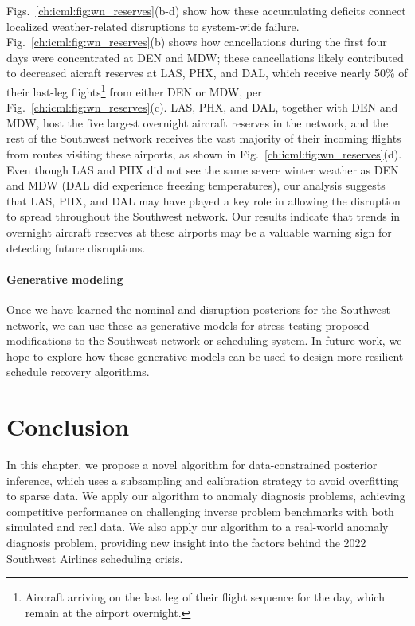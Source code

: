 Figs.~\ref{ch:icml:fig:wn_reserves}(b-d) show how these accumulating deficits connect localized weather-related disruptions to system-wide failure. Fig.~\ref{ch:icml:fig:wn_reserves}(b) shows how cancellations during the first four days were concentrated at DEN and MDW; these cancellations likely contributed to decreased aicraft reserves at LAS, PHX, and DAL, which receive nearly 50\% of their last-leg flights\footnote{Aircraft arriving on the last leg of their flight sequence for the day, which remain at the airport overnight.} from either DEN or MDW, per Fig.~\ref{ch:icml:fig:wn_reserves}(c). LAS, PHX, and DAL, together with DEN and MDW, host the five largest overnight aircraft reserves in the network, and the rest of the Southwest network receives the vast majority of their incoming flights from routes visiting these airports, as shown in Fig.~\ref{ch:icml:fig:wn_reserves}(d). Even though LAS and PHX did not see the same severe winter weather as DEN and MDW (DAL did experience freezing temperatures), our analysis suggests that LAS, PHX, and DAL may have played a key role in allowing the disruption to spread throughout the Southwest network. Our results indicate that trends in overnight aircraft reserves at these airports may be a valuable warning sign for detecting future disruptions.

\paragraph{Generative modeling} Once we have learned the nominal and disruption posteriors for the Southwest network, we can use these as generative models for stress-testing proposed modifications to the Southwest network or scheduling system. In future work, we hope to explore how these generative models can be used to design more resilient schedule recovery algorithms.

\section{Conclusion}\label{ch:icml:conclusion}

In this chapter, we propose a novel algorithm for data-constrained posterior inference, which uses a subsampling and calibration strategy to avoid overfitting to sparse data. We apply our algorithm to anomaly diagnosis problems, achieving competitive performance on challenging inverse problem benchmarks with both simulated and real data. We also apply our algorithm to a real-world anomaly diagnosis problem, providing new insight into the factors behind the 2022 Southwest Airlines scheduling crisis.

